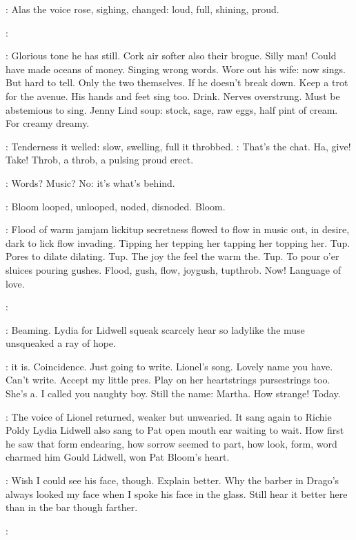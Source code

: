 :
Alas the voice rose,
sighing,
changed:
loud,
full,
shining,
proud.

\simon:

\BloomInt:
Glorious tone he has still.
Cork air softer also their brogue.
Silly man!
Could have made oceans of money.
Singing wrong words.
Wore out his
wife:
now sings.
But hard to tell.
Only the two themselves.
If he doesn't
break down.
Keep a trot for the avenue.
His hands and feet sing too.
Drink.
Nerves overstrung.
Must be abstemious to sing.
Jenny Lind soup:
stock,
sage,
raw eggs,
half pint of cream.
For creamy dreamy.

:
Tenderness it welled:
slow,
swelling,
full it throbbed.
\BloomInt:
That's the chat.
Ha,
give!
Take!
Throb,
a throb,
a pulsing proud erect.

\BloomInt:
Words?
Music?
No:
it's what's behind.

:
Bloom looped,
unlooped,
noded,
disnoded.
Bloom.

\BloomInt:
Flood of warm jamjam lickitup secretness flowed to flow in
music out,
in desire,
dark to lick flow invading.
Tipping her tepping her
tapping her topping her.
Tup.
Pores to dilate dilating.
Tup.
The joy the
feel the warm the.
Tup.
To pour o'er sluices pouring gushes.
Flood,
gush,
flow,
joygush,
tupthrob.
Now!
Language of love.

\simon:

:
Beaming.
Lydia for Lidwell squeak scarcely hear so ladylike the muse unsqueaked a ray of hope.

\BloomInt:
 it is.
Coincidence.
Just going to write.
Lionel's song.
Lovely
name you have.
Can't write.
Accept my little pres.
Play on her
heartstrings pursestrings too.
She's a.
I called you naughty boy.
Still
the name:
Martha.
How strange!
Today.

:
The voice of Lionel returned,
weaker but unwearied.
It sang again to
Richie Poldy Lydia Lidwell also sang to Pat open mouth ear waiting to
wait.
How first he saw that form endearing,
how sorrow seemed to part,
how look,
form,
word charmed him
Gould Lidwell,
won Pat Bloom's heart.

\BloomInt:
Wish I could see his face,
though.
Explain better.
Why the barber in
Drago's always looked my face when I spoke his face in the glass.
Still
hear it better here than in the bar though farther.

\simon:


